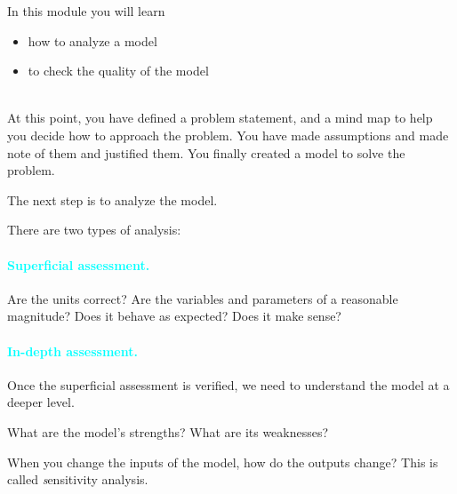 
In this module you will learn
\begin{itemize}
	\item how to analyze a model
	\item to check the quality of the model
\end{itemize}

\hfill \\



At this point, you have defined a problem statement, and a mind map to help you decide how to approach the problem. You have made assumptions and made note of them and justified them.
You finally created a model to solve the problem.

The next step is to analyze the model.

There are two types of analysis:


\paragraph{\textcolor{cyan}{\textbf{Superficial assessment.}}} Are the units correct? Are the variables and parameters of a reasonable magnitude? Does it behave as expected? Does it make sense?



\paragraph{\textcolor{cyan}{\textbf{In-depth assessment.}}} Once the superficial assessment is verified, we need to understand the model at a deeper level. 

What are the model's strengths? What are its weaknesses?

When you change the inputs of the model, how do the outputs change? This is called {\emph sensitivity analysis}. 





